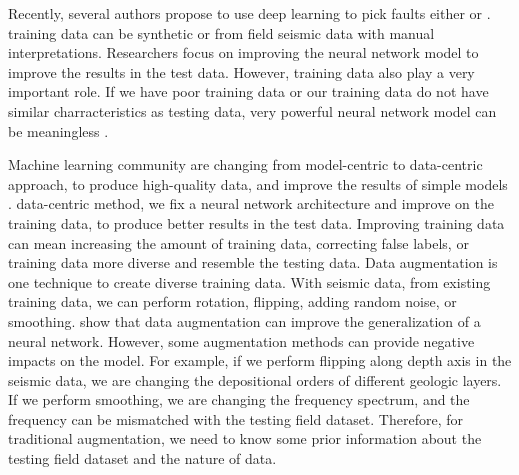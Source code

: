 Recently, several authors propose to use deep learning to pick faults either  \cite[]{huang2017,wuclass2018,zhao2018,wuclass2019} or  \cite[]{mauricio2017,wu2019,pham2021,hu2022}.  training data can be synthetic or from field seismic data with manual interpretations. Researchers focus on improving the neural network model to improve the results in the test data. However, training data also play a very important role. If we have poor training data or our training data do not have similar charracteristics as testing data, very powerful neural network model can be meaningless \cite[]{rolnick2018}.

Machine learning community are changing from model-centric to data-centric approach, to produce high-quality data, and improve the results of simple models \cite[]{song2020,motamedi2021,bartel2021}.   data-centric method, we fix a neural network architecture and improve on the training data, to produce better results in the test data. Improving training data can mean increasing the amount of training data, correcting false labels, or  training data more diverse and resemble the testing data. Data augmentation is one technique to create diverse training data. With seismic data, from existing training data, we can perform rotation, flipping, adding random noise, or smoothing. \cite{nalepa2019,hu2019,zhu2020,zhao2021,zhang2021} show that data augmentation can improve the generalization of a neural network. However, some augmentation methods can provide negative impacts on the model. For example, if we perform flipping along  depth axis in the seismic data, we are changing the depositional orders of different geologic layers. If we perform smoothing, we are changing the frequency spectrum, and the frequency can be mismatched with the testing field dataset. Therefore, for traditional augmentation, we need to know some prior information about the testing field dataset and the nature of data.

